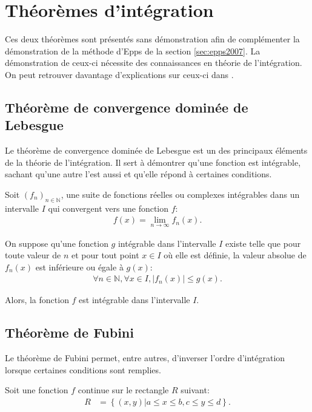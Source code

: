\section{Théorèmes d'intégration}
\label{sec:integration}

Ces deux théorèmes sont présentés sans démonstration afin de
complémenter la démonstration de la méthode d'Epps de la section
\ref{sec:epps2007}. La démonstration de ceux-ci nécessite des
connaissances en théorie de l'intégration. On peut retrouver davantage
d'explications sur ceux-ci dans \cite{teschl2004topics}.

\subsection{Théorème de convergence dominée de Lebesgue}
\label{sec:theor-de-conv}

Le théorème de convergence dominée de Lebesgue est un des principaux
éléments de la théorie de l'intégration. Il sert à démontrer qu'une
fonction est intégrable, sachant qu'une autre l'est aussi et qu'elle
répond à certaines conditions.

Soit $(f_n)_{n\in \mathbb{N}}$, une suite de fonctions réelles ou
complexes intégrables dans un intervalle $\mathit{I}$ qui convergent
vers une fonction $f$:
\begin{align}
  \label{eq:sequencetheoremconvdom}
  f(x) = \lim_{n \to \infty} f_n(x).
\end{align}

On suppose qu'une fonction $g$ intégrable dans l'intervalle
$\mathit{I}$ existe telle que pour toute valeur de $n$ et pour tout
point $x\in I$ où elle est définie, la valeur absolue de $f_n(x)$ est
inférieure ou égale à $g(x)$:
\begin{align}
  \label{eq:theoremeconvdom}
  \forall n \in \mathbb{N}, \forall x \in \mathit{I}, |f_n(x)| \leq
  g(x).
\end{align}

Alors, la fonction $f$ est intégrable dans l'intervalle
$\mathit{I}$.

\subsection{Théorème de Fubini}
\label{sec:theoreme-de-fubini}

Le théorème de Fubini permet, entre autres, d'inverser l'ordre
d'intégration lorsque certaines conditions sont remplies.

Soit une fonction $f$ continue sur le rectangle $\mathit{R}$ suivant:
\begin{align}
  \label{eq:rectanglefubini}
  \mathit{R} &= \left\{(x,y) | a \leq x \leq b, c \leq y \leq d \right\}.
\end{align}

